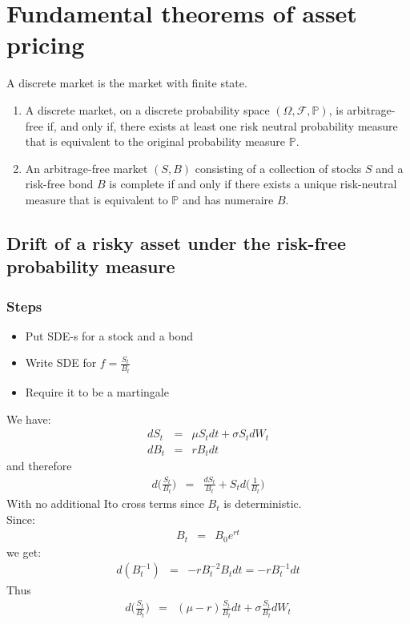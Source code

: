\chapter{Fundamental theorems of asset pricing}
A discrete market is the market with finite state.
\begin{enumerate}
	\item A discrete market, on a discrete {\color{blue} probability space} $(\Omega, \mathscr{F}, \mathbb{P})$, is arbitrage-free if, and only if, there exists at least one risk neutral probability measure that is equivalent to the original probability measure $\mathbb{P}$.
	\item An arbitrage-free market $(S, B)$ consisting of a collection of stocks $S$ and a risk-free bond $B$ is complete if and only if there exists a unique risk-neutral measure that is equivalent to $\mathbb{P}$ and has numeraire $B$.
\end{enumerate}

\section{Drift of a risky asset under the risk-free probability measure}
\subsection{Steps}
\begin{itemize}
	\item Put SDE-s for a stock and a bond
	\item Write SDE for $f = \frac{S_{t}}{B_{t}}$
	\item Require it to be a martingale
\end{itemize}

We have:
\begin{eqnarray}
dS_{t} &=& \mu S_{t}dt + \sigma S_{t}dW_{t}\\
dB_{t} &=& rB_{t}dt
\end{eqnarray}
and therefore
\begin{eqnarray}
d\bigg(\frac{S_{t}}{B_{t}}\bigg) &=& \frac{dS_{t}}{B_{t}} + S_{t}d\bigg(\frac{1}{B_{t}}\bigg)
\end{eqnarray}
With no additional Ito cross terms since $B_{t}$ is deterministic.\\
Since:
\begin{eqnarray}
B_{t} &=& B_{0}e^{rt}
\end{eqnarray}
we get:
\begin{eqnarray}
d(B_{t}^{-1}) &=& -rB_{t}^{-2}B_{t}dt = -rB_{t}^{-1}dt
\end{eqnarray}
Thus
\begin{eqnarray}
d\bigg(\frac{S_{t}}{B_{t}}\bigg) &=& (\mu - r)\frac{S_{t}}{B_{t}}dt + \sigma\frac{S_{t}}{B_{t}}dW_{t}
\end{eqnarray}